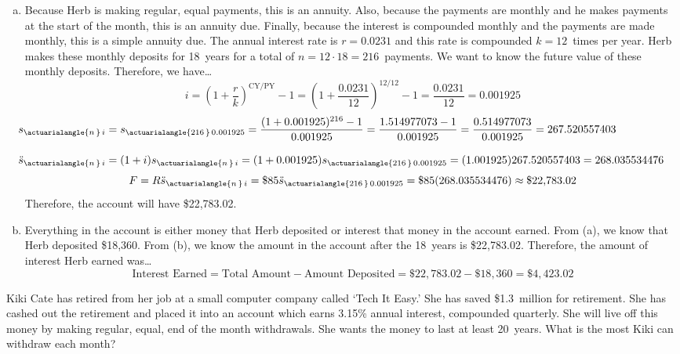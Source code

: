 \documentclass[12pt,letterpaper]{exam}
\begin{document}
\begin{questions}
{\begin{enumerate}[(a)]
\item Because Herb is making regular, equal payments, this is an annuity. Also, because the payments are monthly and he makes payments at the start of the month, this is an annuity due. Finally, because the interest is compounded monthly and the payments are made monthly, this is a simple annuity due. The annual interest rate is $r= 0.0231$ and this rate is compounded $k= 12$~times per year. Herb makes these monthly deposits for 18~years for a total of $n= 12 \cdot 18= 216$~payments. We want to know the future value of these monthly deposits. Therefore, we have\dots
	\[
	i= \left(1 + \dfrac{r}{k} \right)^{\text{CY}/\text{PY}} - 1= \left(1 + \dfrac{0.0231}{12} \right)^{12/12} - 1= \dfrac{0.0231}{12}= 0.001925
	\]
	\[
	\begin{aligned}
	\hspace{-0.75cm} s_{\actuarialangle{n\,}\, i}&= s_{\actuarialangle{216\,}\, 0.001925}= \dfrac{(1 + 0.001925)^{216} - 1}{0.001925}= \dfrac{1.514977073 - 1}{0.001925}= \dfrac{0.514977073}{0.001925}= 267.520557403 \\[0.3cm]
	\hspace{-0.75cm} \ddot{s}_{\actuarialangle{n\,}\, i}&= (1 + i) s_{\actuarialangle{n\,}\, i}= (1 + 0.001925) s_{\actuarialangle{216\,}\, 0.001925}= (1.001925) 267.520557403= 268.035534476	
	\end{aligned}
	\]
	\[
	F= R \ddot{s}_{\actuarialangle{n\,}\, i}= \$85 \ddot{s}_{\actuarialangle{216\,}\, 0.001925}= \$85(268.035534476) \approx \$22,\!783.02
	\] 
Therefore, the account will have \$22,783.02. \pspace

\item Everything in the account is either money that Herb deposited or interest that money in the account earned. From (a), we know that Herb deposited \$18,360. From (b), we know the amount in the account after the 18~years is \$22,783.02. Therefore, the amount of interest Herb earned was\dots
	\[
	\text{Interest Earned}= \text{Total Amount} - \text{Amount Deposited}= \$22,\!783.02 - \$18,\!360= \$4,\!423.02
	\]
\end{enumerate}
}



\newpage
\question[10] Kiki Cate has retired from her job at a small computer company called `Tech It Easy.' She has saved \$1.3~million for retirement. She has cashed out the retirement and placed it into an account which earns 3.15\% annual interest, compounded quarterly. She will live off this money by making regular, equal, end of the month withdrawals. She wants the money to last at least 20~years. What is the most Kiki can withdraw each month? \pspace


\end{questions}
\end{document}
